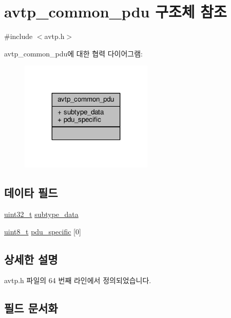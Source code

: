 \hypertarget{structavtp__common__pdu}{}\section{avtp\+\_\+common\+\_\+pdu 구조체 참조}
\label{structavtp__common__pdu}


{\ttfamily \#include $<$avtp.\+h$>$}



avtp\+\_\+common\+\_\+pdu에 대한 협력 다이어그램\+:
\nopagebreak
\begin{figure}[H]
\begin{center}
\leavevmode
\includegraphics[width=179pt]{structavtp__common__pdu__coll__graph}
\end{center}
\end{figure}
\subsection*{데이타 필드}
\begin{DoxyCompactItemize}
\item 
\hyperlink{parse_8c_a6eb1e68cc391dd753bc8ce896dbb8315}{uint32\+\_\+t} \hyperlink{structavtp__common__pdu_a3210e9f18fdc9c29cef7600c4d1e67e9}{subtype\+\_\+data}
\item 
\hyperlink{stdint_8h_aba7bc1797add20fe3efdf37ced1182c5}{uint8\+\_\+t} \hyperlink{structavtp__common__pdu_aeb4e59bbf4adbe8ecf7c0d1200134c3f}{pdu\+\_\+specific} \mbox{[}0\mbox{]}
\end{DoxyCompactItemize}


\subsection{상세한 설명}


avtp.\+h 파일의 64 번째 라인에서 정의되었습니다.



\subsection{필드 문서화}
